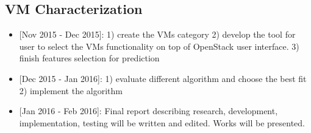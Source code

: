 \subsection{VM Characterization}

\begin{itemize}
\item{[Nov 2015 - Dec 2015]:} 1) create the VMs category 2) develop the tool for user to select the VMs functionality on top of OpenStack user interface. 3) finish features selection for prediction
\item{[Dec 2015 - Jan 2016]:} 1) evaluate different algorithm and choose the best fit 2) implement the algorithm
\item{[Jan 2016 - Feb 2016]:} Final report describing research, development, implementation, testing will be written and edited. Works will be presented.
\end{itemize}
